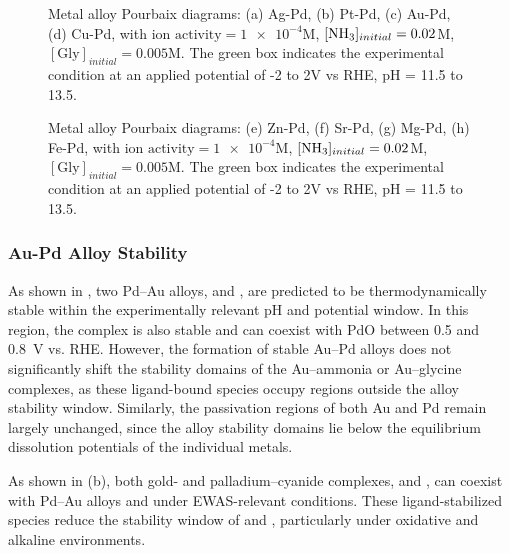 \documentclass[journal=jacsat,manuscript=article]{achemso}
\begin{document}
\begin{figure}[htbp]
\centering
{}
\caption{Metal alloy Pourbaix diagrams: (a) Ag-Pd, (b) Pt-Pd, (c) Au-Pd, (d) Cu-Pd, with $\text{ion activity}=\num{1e-4}$M, $[\ce{NH3}]_{initial}= 0.02$M, $[\text{Gly}]_{initial}=0.005$M. The green box indicates the experimental condition at an applied potential of -2 to 2V vs RHE, pH = 11.5 to 13.5.}
\label{fig:alloy_pourbaix_collage_3}
\end{figure}

\begin{figure}[htbp]
\centering
{}
\caption{Metal alloy Pourbaix diagrams: (e) Zn-Pd, (f) Sr-Pd, (g) Mg-Pd, (h) Fe-Pd, with $\text{ion activity}=\num{1e-4}$M, $[\ce{NH3}]_{initial}= 0.02$M, $[\text{Gly}]_{initial}=0.005$M. The green box indicates the experimental condition at an applied potential of -2 to 2V vs RHE, pH = 11.5 to 13.5.}
\label{fig:alloy_pourbaix_collage_4}
\end{figure}
\subsubsection{Au-Pd Alloy Stability}

As shown in , two Pd–Au alloys,  and , are predicted to be thermodynamically stable within the experimentally relevant pH and potential window. In this region, the \ce{[Au(NH3)_2]^+} complex is also stable and can coexist with PdO between 0.5 and 0.8~V vs. RHE. However, the formation of stable Au–Pd alloys does not significantly shift the stability domains of the Au–ammonia or Au–glycine complexes, as these ligand-bound species occupy regions outside the alloy stability window. Similarly, the passivation regions of both Au and Pd remain largely unchanged, since the alloy stability domains lie below the equilibrium dissolution potentials of the individual metals.

As shown in (b), both gold- and palladium–cyanide complexes,  and , can coexist with Pd–Au alloys and  under EWAS-relevant conditions. These ligand-stabilized species reduce the stability window of  and , particularly under oxidative and alkaline environments.
\end{document}
